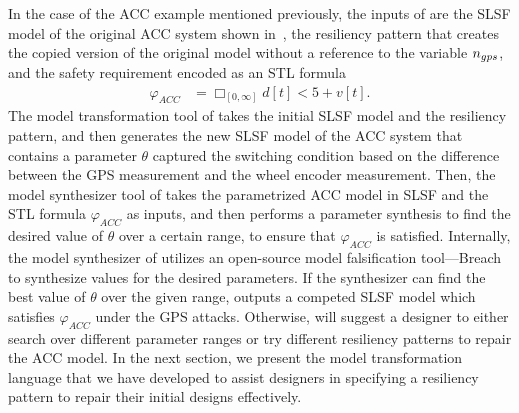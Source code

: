 In the case of the ACC example mentioned previously, the inputs of \toolreaffirm are the SLSF model of the original ACC system shown in~, the resiliency pattern that creates the copied version of the original model without a reference to the variable $n_{gps}$, and the safety requirement encoded as an STL formula 
\begin{align}
\varphi_{ACC} &= \Box_{[0, \infty]} d[t] < 5 + v[t]. 
\end{align}
%
The model transformation tool of \toolreaffirm takes the initial SLSF model and the resiliency pattern, and then generates the new SLSF model of the ACC system that contains a parameter $\theta$ captured the switching condition based on the difference between the GPS measurement and the wheel encoder measurement.
%
%
Then, the model synthesizer tool of \toolreaffirm takes the parametrized ACC model in SLSF and the STL formula $\varphi_{ACC}$ as inputs, and then performs a parameter synthesis to find the desired value of $\theta$ over a certain range, to ensure that $\varphi_{ACC}$ is satisfied. Internally, the model synthesizer of \toolreaffirm utilizes an open-source model falsification tool---Breach~\cite{donze2010breach} to synthesize values for the desired parameters. If the synthesizer can find the best value of $\theta$ over the given range, \toolreaffirm outputs a competed SLSF model which satisfies $\varphi_{ACC}$ under the GPS attacks. Otherwise, \toolreaffirm will suggest a designer to either search over different parameter ranges or try different resiliency patterns to repair the ACC model.   
% 
In the next section, we present the model transformation language that we have developed to assist designers in specifying a resiliency pattern to repair their initial designs effectively.
%
